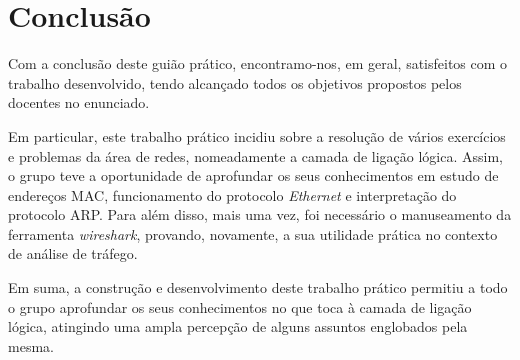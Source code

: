 \documentclass[12pt]{article}
\begin{document}










\section{Conclusão}
    
    \par Com a conclusão deste guião prático, encontramo-nos, em geral, satisfeitos com o trabalho desenvolvido, tendo alcançado todos os objetivos propostos pelos docentes no enunciado.
    
    \par Em particular, este trabalho prático incidiu sobre a resolução de vários exercícios e problemas da área de redes, nomeadamente a camada de ligação lógica. Assim, o grupo teve a oportunidade de aprofundar os seus conhecimentos em estudo de endereços MAC, funcionamento do protocolo \textit{Ethernet} e interpretação do protocolo ARP. Para além disso, mais uma vez, foi necessário o manuseamento da ferramenta \textit{wireshark}, provando, novamente, a sua utilidade prática no contexto de análise de tráfego. 

    \par Em suma, a construção e desenvolvimento deste trabalho prático permitiu a todo o grupo aprofundar os seus conhecimentos no que toca à camada de ligação lógica, atingindo uma ampla percepção de alguns assuntos englobados pela mesma.
\end{document}
